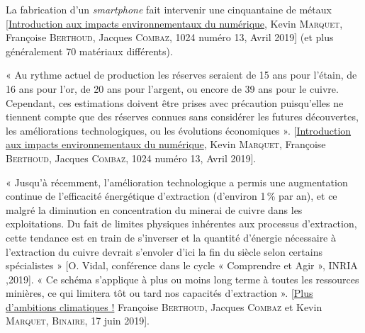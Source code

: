 \begin{jazzitemize}
\item La fabrication d’un \textit{smartphone} fait intervenir une cinquantaine de métaux [\href{https://www.societe-informatique-de-france.fr/wp-content/uploads/2019/04/1024-numero-13_Article19.pdf}{Introduction aux impacts environnementaux du numérique}, Kevin \textsc{Marquet}, Françoise \textsc{Berthoud}, Jacques \textsc{Combaz}, 1024 numéro 13, Avril 2019] (et plus généralement 70 matériaux différents).
\item « Au rythme actuel de production les réserves seraient de 15 ans pour l’étain, de 16 ans pour l’or, de 20 ans pour l’argent, ou encore de 39 ans pour le cuivre. Cependant, ces estimations doivent être prises avec précaution puisqu’elles ne tiennent compte que des réserves connues sans considérer les futures découvertes, les améliorations technologiques, ou les évolutions économiques ». [\href{https://www.societe-informatique-de-france.fr/wp-content/uploads/2019/04/1024-numero-13_Article19.pdf}{Introduction aux impacts environnementaux du numérique}, Kevin \textsc{Marquet}, Françoise \textsc{Berthoud}, Jacques \textsc{Combaz}, 1024 numéro 13, Avril 2019].
\item « Jusqu’à récemment, l’amélioration technologique a permis une augmentation continue de l’efficacité énergétique d’extraction (d’environ 1\,\% par an), et ce malgré la diminution en concentration du minerai de cuivre dans les exploitations. Du fait de limites physiques inhérentes aux processus d’extraction, cette tendance est en train de s’inverser et la quantité d’énergie nécessaire à l’extraction du cuivre devrait s’envoler d’ici la fin du siècle selon certains spécialistes » [O. Vidal, conférence dans le cycle « Comprendre et Agir », INRIA ,2019]. « Ce schéma s’applique à plus ou moins long terme à toutes les ressources minières, ce qui limitera tôt ou tard nos capacités d’extraction ». [\href{https://www.lemonde.fr/blog/binaire/2019/06/17/plus-d-ambitions-climatiques/}{Plus d’ambitions climatiques !} Françoise \textsc{Berthoud}, Jacques \textsc{Combaz} et Kevin \textsc{Marquet}, \textsc{Binaire}, 17 juin 2019].
\end{jazzitemize}


